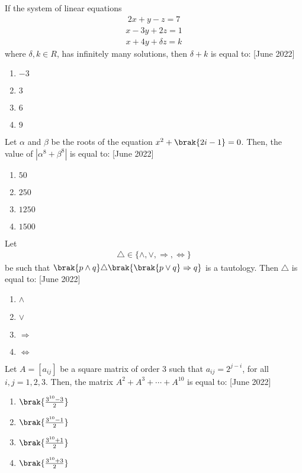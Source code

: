 \item If the system of linear equations 
\begin{align*}
    2x+y-z=7
\end{align*}
\begin{align*}
    x-3y+2z=1
\end{align*}
\begin{align*}
    x+4y+\delta z=k
\end{align*}
where $\delta,k \in R$, has infinitely many solutions, then $\delta+k$ is equal to: \hfill[June 2022]
\begin{multicols}{2}
\begin{enumerate}
    \item $-3$
    \item $3$
    \item $6$
    \item $9$
\end{enumerate}
\end{multicols}

\item Let $\alpha$ and $\beta$ be the roots of the equation $x^2+\brak{2i-1}=0$. Then, the value of $|\alpha^8+\beta^8|$ is equal to: \hfill[June 2022]
\begin{multicols}{2}
\begin{enumerate}
       \item $50$
       \item $250$
       \item $1250$
       \item $1500$
\end{enumerate}
\end{multicols}

\item Let 
\begin{align*}
    \triangle\in\{\wedge, \vee, \Rightarrow, \Leftrightarrow\}
\end{align*} be such that $\brak{p \wedge q}\triangle\brak{\brak{p\vee q}\Rightarrow q}$ is a tautology. Then $\triangle$ is equal to: \hfill[June 2022]
\begin{enumerate}
    \item $\wedge$
    \item $\vee$
    \item $\Rightarrow$
    \item $\Leftrightarrow$
\end{enumerate}

\item Let $A=[a_{ij}]$ be a square matrix of order 3 such that $a_{ij}=2^{j-i}$, for all $i,j=1,2,3$. Then, the matrix $A^2+A^3+\cdots+A^{10}$ is equal to: \hfill[June 2022]
\begin{multicols}{2}
\begin{enumerate}
    \item $\brak{\frac{3^{10}-3}{2}}$
    \item $\brak{\frac{3^{10}-1}{2}}$
    \item $\brak{\frac{3^{10}+1}{2}}$
    \item $\brak{\frac{3^{10}+3}{2}}$
\end{enumerate}
\end{multicols}

